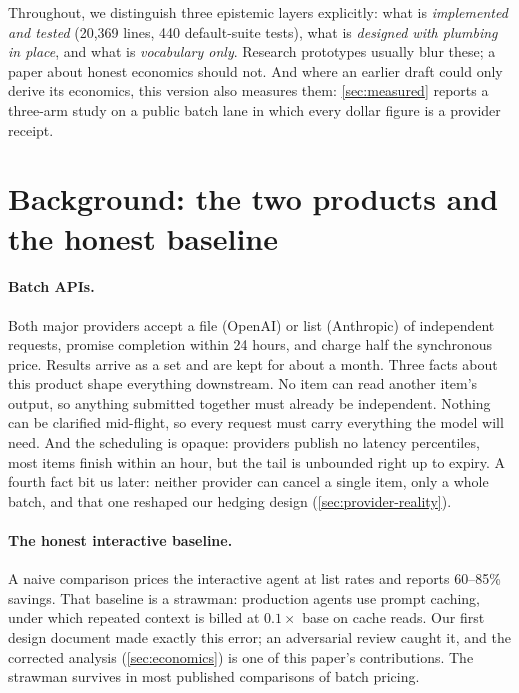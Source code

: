 \documentclass[11pt]{article}
\begin{document}
Throughout, we distinguish three epistemic layers explicitly: what is \emph{implemented and tested} (20{,}369 lines, 440 default-suite tests), what is \emph{designed with plumbing in place}, and what is \emph{vocabulary only}. Research prototypes usually blur these; a paper about honest economics should not. And where an earlier draft could only derive its economics, this version also measures them: \cref{sec:measured} reports a three-arm study on a public batch lane in which every dollar figure is a provider receipt.

\section{Background: the two products and the honest baseline}
\label{sec:background}

\paragraph{Batch APIs.} Both major providers accept a file (OpenAI) or list (Anthropic) of independent requests, promise completion within 24 hours, and charge half the synchronous price. Results arrive as a set and are kept for about a month. Three facts about this product shape everything downstream. No item can read another item's output, so anything submitted together must already be independent. Nothing can be clarified mid-flight, so every request must carry everything the model will need. And the scheduling is opaque: providers publish no latency percentiles, most items finish within an hour, but the tail is unbounded right up to expiry. A fourth fact bit us later: neither provider can cancel a single item, only a whole batch, and that one reshaped our hedging design (\cref{sec:provider-reality}).

\paragraph{The honest interactive baseline.} A naive comparison prices the interactive agent at list rates and reports 60--85\% savings. That baseline is a strawman: production agents use prompt caching, under which repeated context is billed at $0.1\times$ base on cache reads. Our first design document made exactly this error; an adversarial review caught it, and the corrected analysis (\cref{sec:economics}) is one of this paper's contributions. The strawman survives in most published comparisons of batch pricing.
\end{document}
